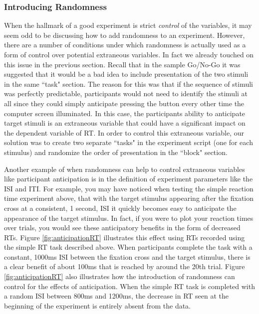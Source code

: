 \subsubsection{Introducing Randomness}
When the hallmark of a good experiment is strict \emph{control} of the variables, it may seem odd to be discussing how to add randomness to an experiment.  However, there are a number of conditions under which randomness is actually used as a form of control over potential \gls{extraneous variables}.  In fact we already touched on this issue in the previous section.  Recall that in the sample Go/No-Go it was suggested that it would be a bad idea to include presentation of the two stimuli in the same ``task" section.  The reason for this was that if the sequence of stimuli was perfectly predictable, participants would not need to identify the stimuli at all since they could simply anticipate pressing the button every other time the computer screen illuminated. In this case, the participants ability to anticipate target stimuli is an extraneous variable that could have a significant impact on the dependent variable of RT.  In order to control this extraneous variable, our solution was to create two separate ``tasks" in the experiment script (one for each stimulus) and randomize the order of presentation in the ``block" section.

Another example of when randomness can help to control extraneous variables like participant anticipation is in the definition of experiment parameters like the ISI and ITI. For example, you may have noticed when testing the simple reaction time experiment above, that with the target stimulus appearing after the fixation cross at a consistent, 1 second, ISI it quickly becomes easy to anticipate the appearance of the target stimulus.  In fact, if you were to plot your reaction times over trials, you would see these  anticipatory benefits in the form of decreased RTs.  Figure \ref{fig:anticipationRT} illustrates this effect using RTs recorded using the simple RT task described above.  When participants complete the task with a constant, 1000ms ISI between the fixation cross and the target stimulus, there is a clear benefit of about 100ms that is reached by around the 20th trial.  Figure \ref{fig:anticipationRT} also illustrates how the introduction of randomness can control for the effects of anticipation.  When the simple RT task is completed with a random ISI between 800ms and 1200ms, the decrease in RT seen at the beginning of the experiment is entirely absent from the data. 

